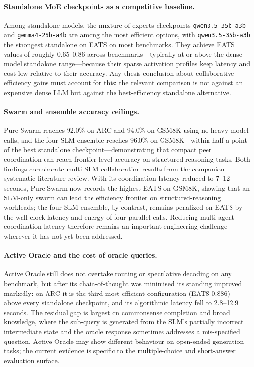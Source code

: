 \paragraph{Standalone MoE checkpoints as a competitive baseline.}
Among standalone models, the mixture-of-experts checkpoints \texttt{qwen3.5-35b-a3b} and \texttt{gemma4-26b-a4b} are among the most efficient options, with \texttt{qwen3.5-35b-a3b} the strongest standalone on EATS on most benchmarks. They achieve EATS values of roughly 0.65--0.86 across benchmarks---typically at or above the dense-model standalone range---because their sparse activation profiles keep latency and cost low relative to their accuracy. Any thesis conclusion about collaborative efficiency gains must account for this: the relevant comparison is not against an expensive dense LLM but against the best-efficiency standalone alternative.

\paragraph{Swarm and ensemble accuracy ceilings.}
Pure Swarm reaches 92.0\% on ARC and 94.0\% on GSM8K using no heavy-model calls, and the four-SLM ensemble reaches 96.0\% on GSM8K---within half a point of the best standalone checkpoint---demonstrating that compact peer coordination can reach frontier-level accuracy on structured reasoning tasks. Both findings corroborate multi-SLM collaboration results from the companion systematic literature review. With its coordination latency reduced to 7--12 seconds, Pure Swarm now records the highest EATS on GSM8K, showing that an SLM-only swarm can lead the efficiency frontier on structured-reasoning workloads; the four-SLM ensemble, by contrast, remains penalized on EATS by the wall-clock latency and energy of four parallel calls. Reducing multi-agent coordination latency therefore remains an important engineering challenge wherever it has not yet been addressed.

\paragraph{Active Oracle and the cost of oracle queries.}
Active Oracle still does not overtake routing or speculative decoding on any benchmark, but after its chain-of-thought was minimised its standing improved markedly: on ARC it is the third most efficient configuration (EATS 0.886), above every standalone checkpoint, and its algorithmic latency fell to 2.8--12.9 seconds. The residual gap is largest on commonsense completion and broad knowledge, where the sub-query is generated from the SLM's partially incorrect intermediate state and the oracle response sometimes addresses a mis-specified question. Active Oracle may show different behaviour on open-ended generation tasks; the current evidence is specific to the multiple-choice and short-answer evaluation surface.

